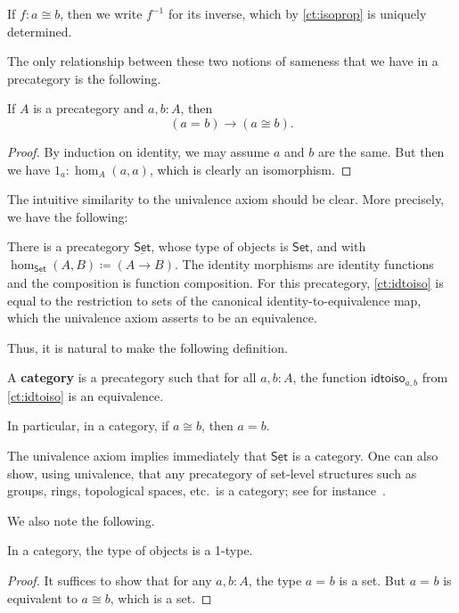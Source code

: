\documentclass{amsart}
\newcommand{\defeq}{\coloneqq}  %
\newcommand{\id}[3][]{\ensuremath{#2 =_{#1} #3}\xspace}
\renewcommand{\set}{\ensuremath{\mathsf{Set}}\xspace}
\newcommand{\uset}{\ensuremath{\underline{\set}}\xspace}
\theoremstyle{definition}
\theoremstyle{remark}
\numberwithin{equation}{section}
\newcommand{\inv}[1]{{#1}^{-1}}
\newcommand{\idtoiso}{\ensuremath{\mathsf{idtoiso}}\xspace}
\begin{document}
If $f:a\cong b$, then we write $\inv f$ for its inverse, which by \autoref{ct:isoprop} is uniquely determined.

The only relationship between these two notions of sameness that we have in a precategory is the following.

\begin{lem}\label{ct:idtoiso}
  If $A$ is a precategory and $a,b:A$, then
  \[(\id a b)\to (a \cong b).\]
\end{lem}
\begin{proof}
  By induction on identity, we may assume $a$ and $b$ are the same.
  But then we have $1_a:\hom_A(a,a)$, which is clearly an isomorphism.
\end{proof}

The intuitive similarity to the univalence axiom should be clear.
More precisely, we have the following:

\begin{eg}\label{ct:precatset}
  There is a precategory \uset, whose type of objects is \set, and with $\hom_{\uset}(A,B) \defeq (A\to B)$.
  The identity morphisms are identity functions and the composition is function composition.
  For this precategory, \autoref{ct:idtoiso} is equal to the restriction to sets of the canonical identity-to-equivalence map, which the univalence axiom asserts to be an equivalence.
\end{eg}

Thus, it is natural to make the following definition.

\begin{defn}\label{ct:category}
  A \textbf{category} is a precategory such that for all $a,b:A$, the function $\idtoiso_{a,b}$ from \autoref{ct:idtoiso} is an equivalence.
\end{defn}

In particular, in a category, if $a\cong b$, then $a=b$.

\begin{eg}\label{ct:eg:set}
  The univalence axiom implies immediately that \uset is a category.
  One can also show, using univalence, that any precategory of set-level structures such as groups, rings, topological spaces, etc.\ is a category; see for instance~\cite{dc:isoeq}.
\end{eg}

We also note the following.

\begin{lem}\label{ct:obj-1type}
  In a category, the type of objects is a 1-type.
\end{lem}
\begin{proof}
  It suffices to show that for any $a,b:A$, the type $\id a b$ is a set.
  But $\id a b$ is equivalent to $a \cong b$, which is a set.
\end{proof}
\end{document}
